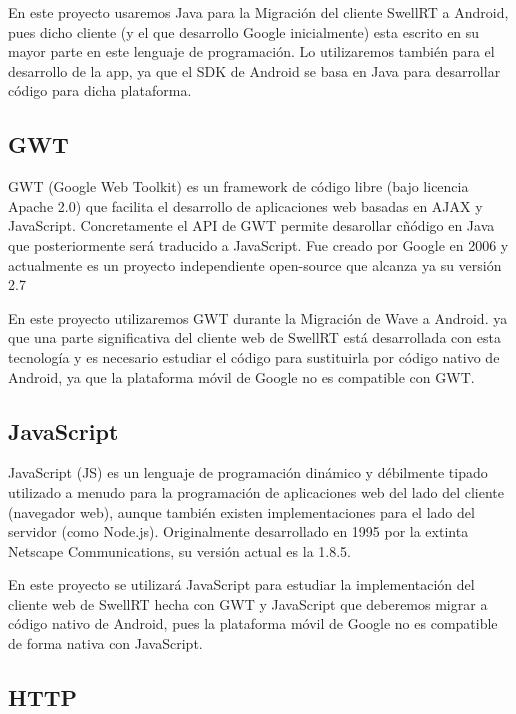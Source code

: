 	En este proyecto usaremos Java para la Migración del cliente SwellRT a Android, pues dicho cliente (y el que desarrollo Google inicialmente) esta escrito en su mayor parte en este lenguaje de programación. Lo utilizaremos también para el desarrollo de la app, ya que el SDK de Android se basa en Java para desarrollar código para dicha plataforma.
    
    \subsection{GWT}\label{ssec:gwt}
    
	GWT \cite{ref:gwt} (Google Web Toolkit) es un framework de código libre (bajo licencia Apache 2.0) que facilita el desarrollo de aplicaciones web basadas en AJAX y JavaScript. Concretamente el API de GWT permite desarollar cñódigo en Java que posteriormente será traducido a JavaScript. Fue creado por Google en 2006 y actualmente es un proyecto independiente open-source que alcanza ya su versión 2.7
	
	En este proyecto utilizaremos GWT durante la Migración de Wave a Android. ya que una parte significativa del cliente web de SwellRT está desarrollada con esta tecnología y es necesario estudiar el código para sustituirla por código nativo de Android, ya que la plataforma móvil de Google no es compatible con GWT.
    
    \subsection{JavaScript}\label{ssec:javascript}
    
	JavaScript \cite{ref:javascript} (JS) es un lenguaje de programación dinámico y débilmente tipado utilizado a menudo para la programación de aplicaciones web del lado del cliente (navegador web), aunque también existen implementaciones para el lado del servidor (como Node.js). Originalmente desarrollado en 1995 por la extinta Netscape Communications, su versión actual es la 1.8.5.  
	
	En este proyecto se utilizará JavaScript para estudiar la implementación del cliente web de SwellRT hecha con GWT y JavaScript que deberemos migrar a código nativo de Android, pues la plataforma móvil de Google no es compatible de forma nativa con JavaScript.
    
    \subsection{HTTP}\label{ssec:http}
    
